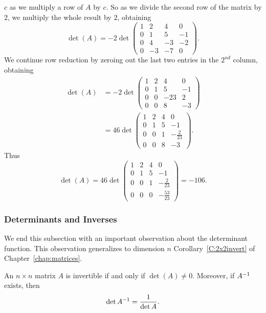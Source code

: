 \documentclass{ximera}
\begin{document}
$c$ as we multiply a row of $A$ by $c$. So as we divide the second 
row of the matrix by $2$, we multiply the whole result by $2$, obtaining   
\[
\det(A) = -2\det\left(\begin{array}{rrrr} 1 & 2 & 4 & 0\\ 0 & 1 & 5 & -1 \\
0 & 4 & -3 & -2 \\ 0 & -3 & -7 & 0 \end{array}\right).
\] 
We continue row reduction by zeroing out the last two entries in
the $2^{nd}$ column, obtaining
\begin{align*}
\det(A) &= -2\det\left(\begin{array}{rrrr} 1 & 2 & 4 & 0\\ 0 & 1 & 5 & -1 \\
0 & 0 & -23 & 2 \\ 0 & 0 & 8 & -3 \end{array}\right) \\
&= 46\det\left(\begin{array}{rrrr} 1 & 2 & 4 & 0\\ 0 & 1 & 5 & -1 \\
0 & 0 & 1 & -\frac{2}{23} \\ 0 & 0 & 8 & -3 \end{array}\right).
\end{align*}
Thus
\[
\det(A) = 46\det\left(\begin{array}{rrrr} 1 & 2 & 4 & 0\\ 0 & 1 & 5 & -1 \\
0 & 0 & 1 & -\frac{2}{23} \\ 0 & 0 & 0 & -\frac{53}{23} \end{array}\right)
= -106.
\]  

\subsubsection*{Determinants and Inverses}

We end this subsection with an important observation about the
determinant function.  This observation generalizes to dimension
$n$ Corollary~\ref{C:2x2invert} of Chapter~\ref{chap:matrices}. 
\begin{theorem}  \label{T:detandinv}
An $n\times n$ matrix $A$ is invertible if and only if $\det(A)\neq 0$.
Moreover, if $A^{-1}$ exists, then 
\begin{equation}  \label{E:detinv}
\det A^{-1} = \frac{1}{\det A}.
\end{equation}
\end{theorem} 
 
\end{document}
